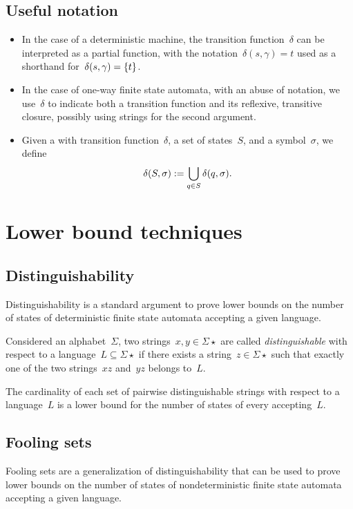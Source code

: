 \subsection{Useful notation}
\begin{itemize}
	\item In the case of a deterministic machine, the transition function~$\delta$ can be interpreted as a partial function, with the notation~$\delta(s,\gamma)=t$ used as a shorthand for~$\delta(s,\gamma)=\{t\}$.
	\item In the case of one-way finite state automata, with an abuse of notation, we use~$\delta$ to indicate both a transition function and its reflexive, transitive closure, possibly using strings for the second argument.
	\item Given a \ONFAs with transition function~$\delta$, a set of states~$S$, and a symbol~$\sigma$, we define
	      \begin{equation*}
		      \delta(S,\sigma):=\bigcup_{q\in S} \delta(q,\sigma) \text.
	      \end{equation*}
\end{itemize}



\section{Lower bound techniques}


\subsection{Distinguishability}\label{sub:distinguishability}
Distinguishability is a standard argument to prove lower bounds on the number of states of deterministic finite state automata accepting a given language.
\begin{defn}
	Considered an alphabet~$\Sigma$, two strings~$x,y\in\Sigma\star$ are called \emph{distinguishable} with respect to a language~$L\subseteq\Sigma\star$ if there exists a string~$z\in\Sigma\star$ such that exactly one of the two strings~$xz$ and~$yz$ belongs to~$L$.
\end{defn}
\begin{thrm}
	The cardinality of each set of pairwise distinguishable strings with respect to a language~$L$ is a lower bound for the number of states of every \ODFA accepting~$L$.
\end{thrm}


\subsection{Fooling sets}\label{sub:foolingsets}
Fooling sets are a generalization of distinguishability that can be used to prove lower bounds on the number of states of nondeterministic finite state automata accepting a given language.

